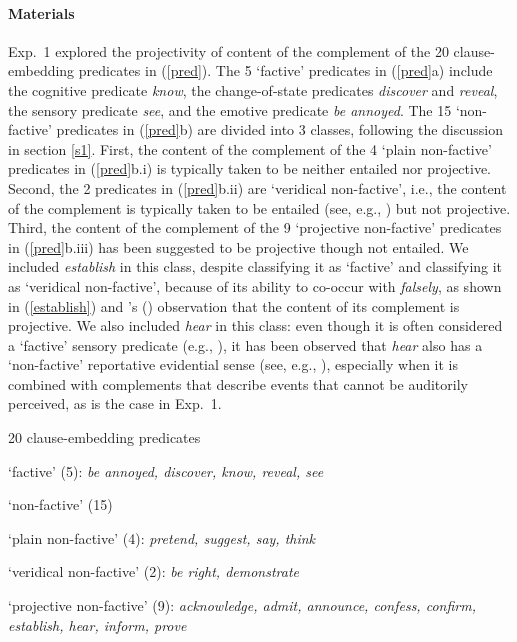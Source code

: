 \documentclass[11pt,fleqn]{article}
\newcommand{\6}{\mbox{$[\hspace*{-.6mm}[$}}
\newcommand{\9}{\mbox{$]\hspace*{-.6mm}]$}}
\newcommand{\citetpos}[1]{\citeauthor{#1}'s (\citeyear{#1})}
\begin{document}
\paragraph{Materials} Exp.~1 explored the projectivity of content of the complement of the 20 clause-embedding predicates in (\ref{pred}). The 5 `factive' predicates in (\ref{pred}a) include the cognitive predicate {\em know}, the change-of-state predicates {\em discover} and {\em reveal}, the sensory predicate {\em see}, and the emotive predicate {\em be annoyed}. The 15 `non-factive' predicates in (\ref{pred}b) are divided into 3 classes, following the discussion in section \ref{s1}. First, the content of the complement of the 4 `plain non-factive' predicates in (\ref{pred}b.i) is typically taken to be neither entailed nor projective. Second, the 2 predicates in  (\ref{pred}b.ii) are `veridical non-factive', i.e., the content of the complement is typically taken to be entailed (see, e.g., \citealt{anand-hacquard2014}) but not projective. Third, the content of the complement of the 9 `projective non-factive' predicates in  (\ref{pred}b.iii)  has been suggested to be projective though not entailed. We included  {\em establish} in this class, despite \citet{wyse} classifying it as `factive' and \citet{swanson2012} classifying it as `veridical non-factive', because of its ability to co-occur with {\em falsely}, as shown in (\ref{establish}) and \citetpos{tbd-variability} observation that the content of its complement is projective. We also included {\em hear} in this class: even though it is often considered a `factive' sensory predicate (e.g., \citealt{beaver-belly,anand-hacquard2014}), it has been observed that {\em hear} also has a `non-factive' reportative evidential sense (see, e.g., \citealt{anderson86,simons07}), especially when it is combined with complements that describe events that cannot be auditorily perceived, as is the case in Exp.~1. 


\begin{exe}
\ex\label{pred} 20 clause-embedding predicates 

\begin{xlist}

\ex `factive' (5): {\em be annoyed, discover, know, reveal, see}

\ex `non-factive' (15)

\begin{xlist}

\ex `plain non-factive' (4): {\em pretend, suggest, say, think}

\ex `veridical non-factive' (2): {\em be right, demonstrate}

\ex `projective non-factive' (9): {\em acknowledge, admit, announce, confess, confirm, establish, hear, inform, prove}


\end{xlist}

\end{xlist}

\end{exe}
\end{document}
